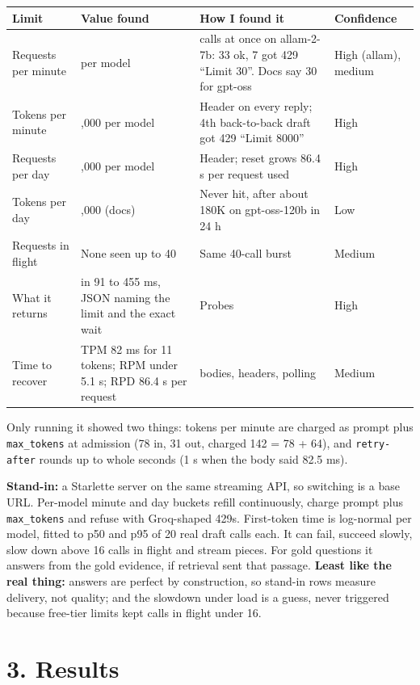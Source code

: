 \documentclass[10pt]{article}
\begin{document}
{\scriptsize\setlength{\tabcolsep}{2pt}\noindent\begin{tabularx}{\linewidth}{@{}>{\raggedright\arraybackslash}p{2.6cm}>{\raggedright\arraybackslash}X>{\raggedright\arraybackslash}X>{\raggedright\arraybackslash}X@{}}\toprule
\textbf{Limit} & \textbf{Value found} & \textbf{How I found it} & \textbf{Confidence} \\ \midrule
Requests per minute & 30 per model & 40 calls at once on allam-2-7b: 33 ok, 7 got 429 ``Limit 30''. Docs say 30 for gpt-oss & High (allam), medium \\
Tokens per minute & 8,000 per model & Header on every reply; 4th back-to-back draft got 429 ``Limit 8000'' & High \\
Requests per day & 1,000 per model & Header; reset grows 86.4 s per request used & High \\
Tokens per day & 200,000 (docs) & Never hit, after about 180K on gpt-oss-120b in 24 h & Low \\
Requests in flight & None seen up to 40 & Same 40-call burst & Medium \\
What it returns & 429 in 91 to 455 ms, JSON naming the limit and the exact wait & Probes & High \\
Time to recover & TPM 82 ms for 11 tokens; RPM under 5.1 s; RPD 86.4 s per request & 429 bodies, headers, polling & Medium \\
\bottomrule\end{tabularx}}

Only running it showed two things: tokens per minute are charged as prompt plus \texttt{max\_tokens} at admission (78 in, 31 out, charged 142 = 78 + 64), and \texttt{retry-after} rounds up to whole seconds (1 s when the body said 82.5 ms).

\textbf{Stand-in:} a Starlette server on the same streaming API, so switching is a base URL. Per-model minute and day buckets refill continuously, charge prompt plus \texttt{max\_tokens} and refuse with Groq-shaped 429s. First-token time is log-normal per model, fitted to p50 and p95 of 20 real draft calls each. It can fail, succeed slowly, slow down above 16 calls in flight and stream pieces. For gold questions it answers from the gold evidence, if retrieval sent that passage. \textbf{Least like the real thing:} answers are perfect by construction, so stand-in rows measure delivery, not quality; and the slowdown under load is a guess, never triggered because free-tier limits kept calls in flight under 16.

\section*{3. Results}
\end{document}
